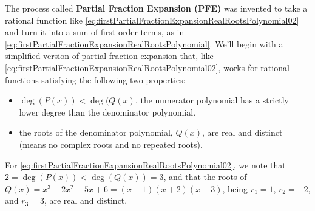 The process called \textbf{Partial Fraction Expansion (PFE)} was invented to take a rational function like \eqref{eq:firstPartialFractionExpansionRealRootsPolynomial02} and turn it into a sum of first-order terms, as in \eqref{eq:firstPartialFractionExpansionRealRootsPolynomial}. We'll begin with a simplified version of partial fraction expansion that, like \eqref{eq:firstPartialFractionExpansionRealRootsPolynomial02}, works for rational functions satisfying the following two properties:
\begin{itemize}
    \item $\deg(P(x)) < \deg(Q(x)$, the numerator polynomial has a strictly lower degree than the denominator polynomial.
    \item the roots of the denominator polynomial, $Q(x)$, are real and distinct (means no complex roots and no repeated roots).
\end{itemize}
For \eqref{eq:firstPartialFractionExpansionRealRootsPolynomial02}, we note that $2 = \deg(P(x)) < \deg(Q(x)) = 3$, and that the roots of $Q(x) = x^3 - 2x^2 - 5x + 6 = (x - 1)(x + 2)(x - 3)$, being $r_1=1$, $r_2=-2$, and $r_3 = 3$, are real and distinct. \\


